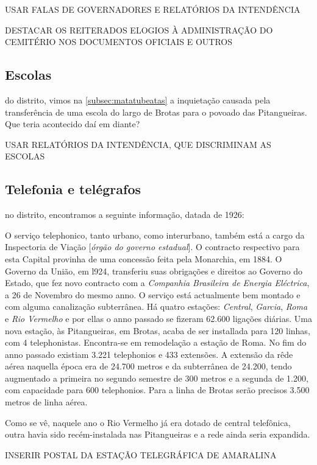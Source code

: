USAR FALAS DE GOVERNADORES E RELATÓRIOS DA INTENDÊNCIA

DESTACAR OS REITERADOS ELOGIOS À ADMINISTRAÇÃO DO CEMITÉRIO NOS DOCUMENTOS OFICIAIS E OUTROS

\subsection{Escolas} 

do distrito, vimos na \autoref{subsec:matatubeatas} a inquietação causada pela transferência de uma escola do largo de Brotas para o povoado das Pitangueiras. Que teria acontecido daí em diante?



USAR RELATÓRIOS DA INTENDÊNCIA, QUE DISCRIMINAM AS ESCOLAS

\subsection{Telefonia e telégrafos} 

no distrito, encontramos a seguinte informação, datada de 1926:

\begin{citacao}
O serviço telephonico, tanto urbano, como interurbano, também está a cargo da Inspectoria de Viação [\textit{órgão do governo estadual}].
O contracto respectivo para esta Capital provinha de uma concessão feita pela Monarchia, em 1884.
O Governo da União, em l924, transferiu suas obrigações e direitos ao Governo do Estado, que fez novo contracto com a \textit{Companhia Brasileira de Energia Eléctrica}, a 26 de Novembro do mesmo anno.
O serviço está actualmente bem montado e com alguma canalização subterrânea.
Há quatro estações: \textit{Central}, \textit{Garcia}, \textit{Roma} e \textit{Rio Vermelho} e por ellas o anno passado se fizeram 62.600 ligações diárias.
Uma nova estação, às Pitangueiras, em Brotas, acaba de ser installada para 120 linhas, com 4 telephonistas.
Encontra-se em remodelação a estação de Roma.
No fim do anno passado existiam 3.221 telephonios e 433 extensões.
A extensão da rêde aérea naquella época era de 24.700 metros e da subterrânea de 24.200, tendo augmentado a primeira no segundo semestre de 300 metros e a segunda
de 1.200, com capacidade para 600 telephonios.
Para a linha de Brotas serão precisos 3.500 metros de linha aérea. \cite[pp.~266-267]{bahia_rpe_1926}
\end{citacao}

Como se vê, naquele ano o Rio Vermelho já era dotado de central telefônica, outra havia sido recém-instalada nas Pitangueiras e a rede ainda seria expandida.

INSERIR POSTAL DA ESTAÇÃO TELEGRÁFICA DE AMARALINA